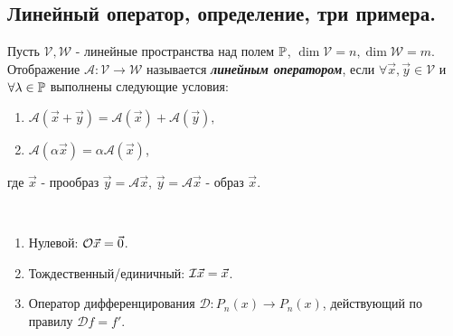 \subsection{
    Линейный оператор, определение, три примера.
}

\begin{definition}
    Пусть $\mathcal{V}, \mathcal{W}$ - 
    линейные пространства над полем $\mathbb{P}$, 
    $\dim \mathcal{V} = n, \dim \mathcal{W} = m$. 
    Отображение $\mathscr{A} \colon \mathcal{V} 
    \to \mathcal{W}$ называется 
    \textit{\textbf{линейным оператором}}, 
    если $\forall \vec{x}, \vec{y} \in 
    \mathcal{V}$ и $\forall \lambda \in \mathbb{P}$ 
    выполнены следующие условия:
    
    \begin{enumerate}[nosep]
        \item $\mathscr{A}(\vec{x} + \vec{y}) = 
        \mathscr{A}(\vec{x}) + \mathscr{A}(\vec{y}),$
        \item $\mathscr{A}(\alpha\vec{x}) = 
        \alpha\mathscr{A}(\vec{x})$,
    \end{enumerate}
    где $\vec{x}$ - прообраз $\vec{y} = \mathscr{A}\vec{x}$,
    $\vec{y} = \mathscr{A}\vec{x}$ - образ $\vec{x}$.
\end{definition}

\begin{example}~

    \begin{enumerate}[nosep]
        \item Нулевой: $\mathcal{O}\vec{x} = \vec{0}$.
        \item Тождественный/единичный: 
        $\mathcal{I}\vec{x} = \vec{x}$.
        \item Оператор дифференцирования $\mathscr{D} \colon P_n(x) \to P_n(x)$, действующий по правилу $\mathscr{D}f = f'$.
    \end{enumerate}
\end{example}
